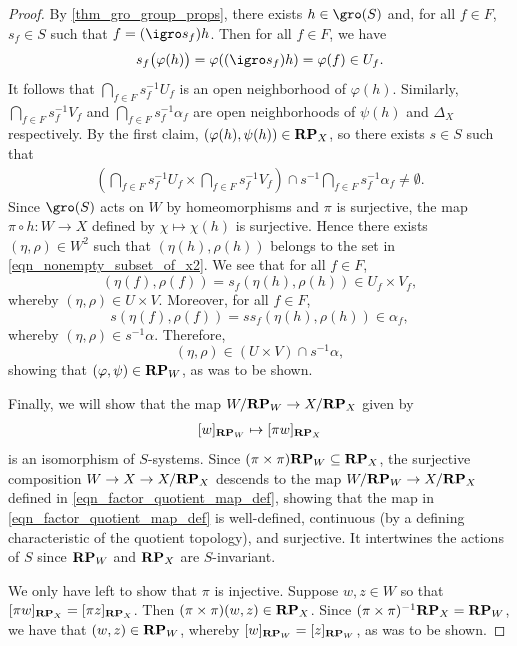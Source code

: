 \begin{proof}
    By \cref{thm_gro_group_props}, there exists $h \in \gro(S)$ and, for all $f \in F$, $s_f \in S$ such that $f = (\igro s_f) h$.
    Then for all $f \in F$, we have 
    \[
        s_f \big(\varphi(h)\big) = \varphi((\igro s_f) h) = \varphi (f) \in U_f.
    \]
    It follows that $\bigcap_{f \in F} s_f^{-1} U_f$ is an open neighborhood of $\varphi(h)$.
    Similarly, $\bigcap_{f \in F} s_f^{-1} V_f$ and $\bigcap_{f \in F} s_f^{-1} \alpha_f$ are open neighborhoods of $\psi(h)$ and $\Delta_X$ respectively. By the first claim, $(\varphi(h), \psi(h)) \in \mathbf{RP}_X$, so there exists $s \in S$ such that
    \begin{align}
        \label{eqn_nonempty_subset_of_x2}
        \left( \bigcap_{f \in F} s_f^{-1} U_f \times \bigcap_{f \in F} s_f^{-1} V_f \right) \cap s^{-1} \bigcap_{f \in F} s_f^{-1} \alpha_f \neq \emptyset.
    \end{align}
    Since $\gro(S)$ acts on $W$ by homeomorphisms and $\pi$ is surjective, the map $\pi \circ h: W \to X$ defined by $\chi \mapsto \chi(h)$ is surjective.  Hence there exists $(\eta, \rho) \in W^2$ such that $(\eta(h), \rho(h))$ belongs to the set in \eqref{eqn_nonempty_subset_of_x2}. We see that for all $f \in F$,
    \[(\eta(f), \rho(f)) = s_f (\eta(h), \rho(h)) \in U_f \times V_f,\]
    whereby $(\eta,\rho) \in U \times V$. Moreover, for all $f \in F$,
    \[s (\eta(f), \rho(f)) = s s_f (\eta(h), \rho(h)) \in \alpha_f,\]
    whereby $(\eta, \rho) \in s^{-1} \alpha$.
    Therefore,
    \[(\eta, \rho) \in (U \times V) \cap s^{-1} \alpha,\]
    showing that $(\varphi,\psi) \in \mathbf{RP}_W$, as was to be shown.

    Finally, we will show that the map $W/ \mathbf{RP}_W \to X / \mathbf{RP}_X$ given by 
    \begin{align}
    \label{eqn_factor_quotient_map_def}
        [w]_{\mathbf{RP}_W} \mapsto [\pi w]_{\mathbf{RP}_X}
    \end{align}
    is an isomorphism of $S$-systems.  Since $(\pi \times \pi) \mathbf{RP}_W \subseteq \mathbf{RP}_X$, the surjective composition $W \to X \to X/\mathbf{RP}_X$ descends to the map $W / \mathbf{RP}_W \to X / \mathbf{RP}_X$ defined in \eqref{eqn_factor_quotient_map_def}, showing that the map in \eqref{eqn_factor_quotient_map_def} is well-defined, continuous (by a defining characteristic of the quotient topology), and surjective.
    It intertwines the actions of $S$ since $\mathbf{RP}_W$ and $\mathbf{RP}_X$ are $S$-invariant.

    We only have left to show that $\pi$ is injective.  Suppose $w, z \in W$ so that $[\pi w]_{\mathbf{RP}_X} = [\pi z]_{\mathbf{RP}_X}$.  Then $(\pi \times \pi) (w,z) \in \mathbf{RP}_X$.  Since $(\pi \times \pi)^{-1} \mathbf{RP}_X = \mathbf{RP}_W$, we have that $(w,z) \in \mathbf{RP}_W$, whereby $[w]_{\mathbf{RP}_W} = [z]_{\mathbf{RP}_W}$, as was to be shown.
\end{proof}

